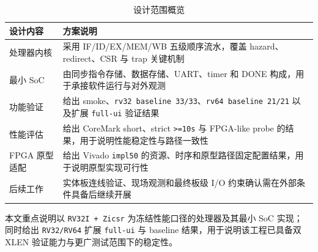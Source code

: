 \begin{table}[H]
    \centering
    \small
    \caption{设计范围概览}
    \begin{tabularx}{0.95\textwidth}{L{0.22\textwidth} Y}
        \toprule
        设计内容 & 方案说明 \\
        \midrule
        处理器内核 & 采用 IF/ID/EX/MEM/WB 五级顺序流水，覆盖 hazard、redirect、CSR 与 trap 关键机制 \\
        最小 SoC & 由同步指令存储、数据存储、UART、timer 和 DONE 构成，用于承接软件运行与对外观测 \\
        功能验证 & 给出 smoke、\texttt{rv32 baseline 33/33}、\texttt{rv64 baseline 21/21} 以及扩展 \texttt{full-ui} 验证结果 \\
        性能评估 & 给出 CoreMark short、strict \texttt{>=10s} 与 FPGA-like probe 的结果，用于说明性能稳定性与路径一致性 \\
        FPGA 原型适配 & 给出 Vivado \texttt{impl50} 的资源、时序和原型路径固定配置结果，用于说明原型实现可行性 \\
        后续工作 & 实体板连线验证、现场观测和最终板级 I/O 约束确认需在外部条件具备后继续开展 \\
        \bottomrule
    \end{tabularx}
\end{table}

本文重点说明以 \texttt{RV32I + Zicsr} 为冻结性能口径的处理器及其最小 SoC 实现；
同时给出 \texttt{RV32/RV64} 扩展 \texttt{full-ui} 与 baseline 结果，用于说明该工程已具备双 XLEN 验证能力与更广测试范围下的稳定性。
